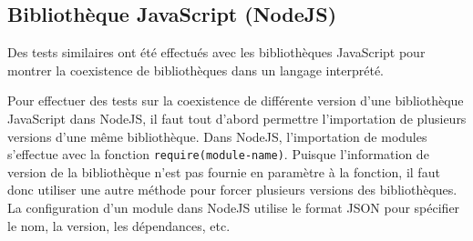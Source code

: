 








\subsection{Bibliothèque JavaScript (NodeJS)}

Des tests similaires ont été effectués avec les bibliothèques JavaScript pour
montrer la coexistence de bibliothèques dans un langage interprété.

Pour effectuer des tests sur la coexistence de différente version d'une bibliothèque
JavaScript dans NodeJS, il faut tout d'abord permettre l'importation de plusieurs
versions d'une même bibliothèque. Dans NodeJS, l'importation de modules s'effectue
avec la fonction \verb|require(module-name)|. Puisque l'information de version
de la bibliothèque n'est pas fournie en paramètre à la fonction, il faut donc
utiliser une autre méthode pour forcer plusieurs versions des bibliothèques.
La configuration d'un module dans NodeJS utilise le format JSON pour spécifier
le nom, la version, les dépendances, etc.

